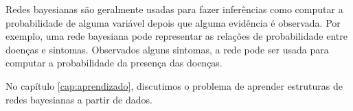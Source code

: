 Redes bayesianas são geralmente usadas para fazer inferências como computar a probabilidade de alguma variável depois que alguma evidência é observada. Por exemplo, uma rede bayesiana pode representar as relações de probabilidade entre doenças e sintomas. Observados alguns sintomas, a rede pode ser usada para computar a probabilidade da presença das doenças.

No capítulo \ref{cap:aprendizado}, discutimos o problema de aprender estruturas de redes bayesianas a partir de dados.
